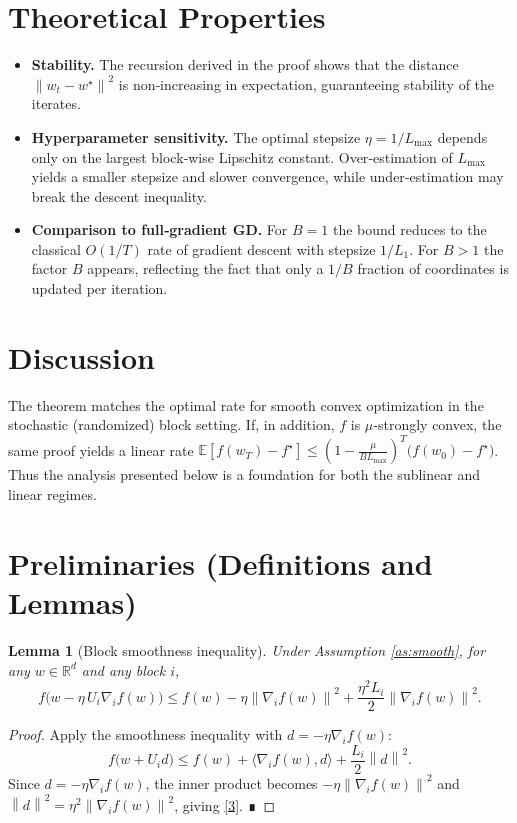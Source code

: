 \documentclass{article}
\newtheorem{lemma}{Lemma}
\newcommand{\E}{\mathbb{E}}
\newcommand{\R}{\mathbb{R}}
\newcommand{\norm}[1]{\left\lVert #1\right\rVert}
\newcommand{\ip}[2]{\langle #1 , #2\rangle}
\newcommand{\block}[1]{U_{#1}}
\begin{document}
\section*{Theoretical Properties}
\begin{itemize}[leftmargin=*]
\item \textbf{Stability.} The recursion derived in the proof shows that the distance
$\norm{w_{t}-w^{\star}}^{2}$ is non‑increasing in expectation, guaranteeing stability of the iterates.
\item \textbf{Hyperparameter sensitivity.} The optimal stepsize $\eta=1/L_{\max}$ depends only on the
largest block‑wise Lipschitz constant. Over‑estimation of $L_{\max}$ yields a smaller stepsize and slower convergence, while under‑estimation may break the descent inequality.
\item \textbf{Comparison to full‑gradient GD.} For $B=1$ the bound reduces to the classical $O(1/T)$ rate of gradient descent with stepsize $1/L_{1}$. For $B>1$ the factor $B$ appears, reflecting the fact that only a $1/B$ fraction of coordinates is updated per iteration.
\end{itemize}

\section*{Discussion}
The theorem matches the optimal rate for smooth convex optimization in the stochastic (randomized) block setting.  If, in addition, $f$ is $\mu$‑strongly convex, the same proof yields a linear rate
$\E[f(w_{T})-f^{\star}]\le (1-\frac{\mu}{B L_{\max}})^{T}\bigl(f(w_{0})-f^{\star}\bigr)$.
Thus the analysis presented below is a foundation for both the sublinear and linear regimes.

\newpage

\section*{Preliminaries (Definitions and Lemmas)}
\begin{lemma}[Block smoothness inequality]\label{lem:smooth}
Under Assumption \ref{as:smooth}, for any $w\in\R^{d}$ and any block $i$,
\[
f\!\bigl(w-\eta\,\block{i}\nabla_{i}f(w)\bigr)
\le f(w)-\eta \norm{\nabla_{i}f(w)}^{2}
+\frac{\eta^{2}L_{i}}{2}\norm{\nabla_{i}f(w)}^{2}.
\tag{3}
\]
\end{lemma}
\begin{proof}
Apply the smoothness inequality with $d=-\eta\nabla_{i}f(w)$:
\[
f\bigl(w+\block{i}d\bigr)\le f(w)+\ip{\nabla_{i}f(w)}{d}
+\frac{L_{i}}{2}\norm{d}^{2}.
\]
Since $d=-\eta\nabla_{i}f(w)$, the inner product becomes $-\eta\norm{\nabla_{i}f(w)}^{2}$ and
$\norm{d}^{2}= \eta^{2}\norm{\nabla_{i}f(w)}^{2}$, giving \eqref{3}. ∎
\end{proof}
\end{document}
